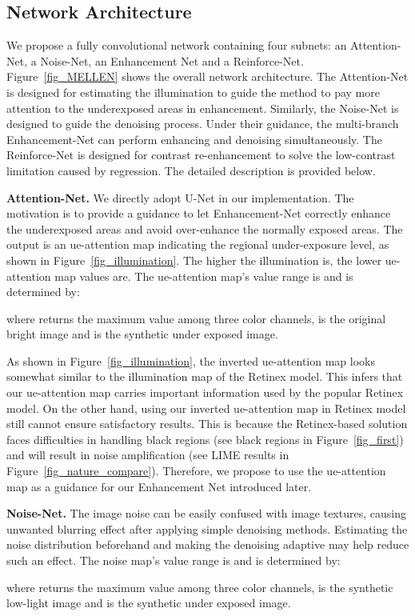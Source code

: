 \subsection{Network Architecture}
We propose a fully convolutional network containing four subnets: an Attention-Net, a Noise-Net, an Enhancement Net and a Reinforce-Net. Figure~\ref{fig_MELLEN} shows the overall network architecture. The Attention-Net is designed for estimating the illumination to guide the method to pay more attention to the underexposed areas in enhancement. Similarly, the Noise-Net is designed to guide the denoising process. Under their guidance, the multi-branch Enhancement-Net can perform enhancing and denoising simultaneously. The Reinforce-Net is designed for contrast re-enhancement to solve the low-contrast limitation caused by regression. The detailed description is provided below.

{\bf Attention-Net.} We directly adopt U-Net in our implementation. The motivation is to provide a guidance to let Enhancement-Net correctly enhance the underexposed areas and avoid over-enhance the normally exposed areas. The output is an ue-attention map indicating the regional under-exposure level, as shown in Figure~\ref{fig_illumination}. The higher the illumination is, the lower ue-attention map values are. The ue-attention map's value range is  and is determined by:
\begin{shrinkeq}{0.1ex}{
		
}\end{shrinkeq}
where  returns the maximum value among three color channels,  is the original bright image and  is the synthetic under exposed image.

As shown in Figure~\ref{fig_illumination}, the inverted ue-attention map looks somewhat similar to the illumination map of the Retinex model. This infers that our ue-attention map carries important information used by the popular Retinex model. On the other hand, using our inverted ue-attention map in Retinex model still cannot ensure satisfactory results. This is because the Retinex-based solution faces difficulties in handling black regions (see black regions in Figure~\ref{fig_first}) and will result in noise amplification (see LIME results in Figure~\ref{fig_nature_compare}). Therefore, we propose to use the ue-attention map as a guidance for our Enhancement Net introduced later.

{\bf Noise-Net.} The image noise can be easily confused with image textures, causing unwanted blurring effect after applying simple denoising methods. Estimating the noise distribution beforehand and making the denoising adaptive may help reduce such an effect. The noise map's value range is  and is determined by:
\begin{shrinkeq}{0.1ex}{
		
}\end{shrinkeq}
where  returns the maximum value among three color channels,  is the synthetic low-light image and  is the synthetic under exposed image.

